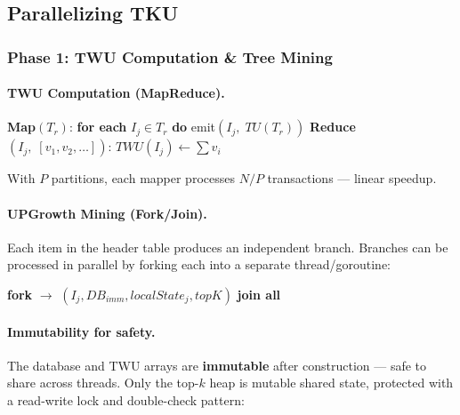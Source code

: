 \subsection{Parallelizing TKU}

\subsubsection{Phase 1: TWU Computation \& Tree Mining}

\paragraph{TWU Computation (MapReduce).}
\begin{algorithm}[H]
\caption{MapReduce for TWU Computation}
\begin{algorithmic}[1]
\State \textbf{Map}$(T_r)$: \textbf{for each} $I_j \in T_r$ \textbf{do} emit$(I_j,\; TU(T_r))$
\State \textbf{Reduce}$(I_j,\; [v_1, v_2, \ldots])$: $TWU(I_j) \leftarrow \sum v_i$
\end{algorithmic}
\end{algorithm}

With $P$ partitions, each mapper processes $N/P$ transactions --- linear speedup.

\paragraph{UPGrowth Mining (Fork/Join).}
Each item in the header table produces an independent branch. Branches can be processed in parallel by forking each into a separate thread/goroutine:

\begin{algorithm}[H]
\caption{Parallel UPGrowth via Fork/Join}
\begin{algorithmic}[1]
 
    \State \textbf{fork} $\to$ $(I_j, DB_{imm}, localState_j, topK)$
\EndFor
\State \textbf{join all} 
\end{algorithmic}
\end{algorithm}

\paragraph{Immutability for safety.}
The database and TWU arrays are \textbf{immutable} after construction --- safe to share across threads. Only the top-$k$ heap is mutable shared state, protected with a read-write lock and double-check pattern:

